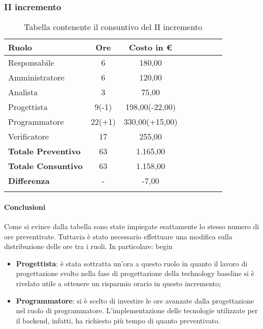 \subsubsection{II incremento}
\begin{longtable}{|l|c|c|c|c|c|c|c|}
	\hline
	\rowcolor{lighter-grayer}
	\textbf{Ruolo}             & \textbf{Ore} & \textbf{Costo in €} \\
	\hline
	\endfirsthead

	\hline
	Responsabile               & 6           & 180,00              \\
	\hline
	\hline
	Amministratore             & 6       & 120,00      \\
	\hline
	\hline
	Analista                   & 3       & 75,00   \\
	\hline
	\hline
	Progettista                & 9(-1)            & 198,00(-22,00)              \\
	\hline
	\hline
	Programmatore              & 22(+1)            & 330,00(+15,00)                   \\
	\hline
	\hline
	Verificatore               & 17       & 255,00    \\
	\hline
	\textbf{Totale Preventivo} & 63          & 1.165,00            \\
	\hline
	\hline
	\textbf{Totale Consuntivo} & 63          & 1.158,00            \\
	\hline
	\hline
	\textbf{Differenza}        & -           & -7,00           \\
	\hline
	\rowcolor{white}
	\caption{Tabella contenente il consuntivo del II incremento}
\end{longtable}
\paragraph{Conclusioni}
Come si evince dalla tabella sono state impiegate esattamente lo stesso numero di ore preventivate. Tuttavia è stato necessario effettuare una modifica sulla distribuzione delle ore tra i ruoli. In particolare:
begin\begin{itemize}
	\item \textbf{Progettista}: è stata sottratta un'ora a questo ruolo in quanto il lavoro di progettazione svolto nella fase di progettazione della technology baseline si è rivelato utile a ottenere un risparmio orario in questo incremento;
	\item \textbf{Programmatore}: si è scelto di investire le ore avanzate dalla progettazione nel ruolo di programmatore. L'implementazione delle tecnologie utilizzate per il backend, infatti, ha richiesto più tempo di quanto preventivato.
\end{itemize} 

